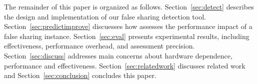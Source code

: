 
The remainder of this paper is organized as follows. 
Section~\ref{sec:detect} describes the design and implementation of our false sharing detection tool. Section~\ref{sec:predictimprove} discuesses how \cheetah{} assesses the performance impact of a false sharing instance. Section~\ref{sec:eval} presents experimental results, including effectiveness, performance overhead, and assessment precision. Section~\ref{sec:discuss} addresses main concerns about hardware dependence, performance and effectiveness. Section~\ref{sec:relatedwork} discusses related work and Section~\ref{sec:conclusion} concludes this paper. 



